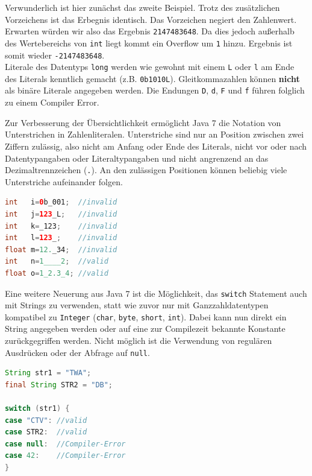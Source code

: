 \documentclass[times, 10pt,twocolumn]{article}
\begin{document}
Verwunderlich ist hier zunächst das zweite Beispiel. Trotz des zusätzlichen Vorzeichens ist das Erbegnis identisch. Das Vorzeichen negiert den Zahlenwert. Erwarten würden wir also das Ergebnis \texttt{2147483648}. Da dies jedoch außerhalb des Wertebereichs von \texttt{int} liegt kommt ein Overflow um \texttt{1} hinzu. Ergebnis ist somit wieder \texttt{-2147483648}.\\

Literale des Datentyps \texttt{long} werden wie gewohnt mit einem \texttt{L} oder \texttt{l} am Ende des Literals kenntlich gemacht (z.B. \texttt{0b1010L}). Gleitkommazahlen können \textbf{nicht} als binäre Literale angegeben werden. Die Endungen \texttt{D}, \texttt{d}, \texttt{F} und \texttt{f} führen folglich zu einem Compiler Error.

Zur Verbesserung der Übersichtlichkeit ermöglicht Java 7 die Notation von Unterstrichen in Zahlenliteralen. Unterstriche sind nur an Position zwischen zwei Ziffern zulässig, also nicht am Anfang oder Ende des Literals, nicht vor oder nach Datentypangaben oder Literaltypangaben und nicht angrenzend an das Dezimaltrennzeichen (\texttt{.}).\cite{apressjava} An den zulässigen Positionen können beliebig viele Unterstriche aufeinander folgen.\cite{heiseWasistNeu}

\begin{lstlisting}[language=java,breaklines=true]
int   i=0b_001;  //invalid
int   j=123_L;   //invalid
int   k=_123;    //invalid
int   l=123_;    //invalid
float m=12._34;  //invalid
int   n=1____2;  //valid
float o=1_2.3_4; //valid
\end{lstlisting}

Eine weitere Neuerung aus Java 7 ist die Möglichkeit, das \texttt{switch} Statement auch mit Strings zu verwenden, statt wie
zuvor nur mit Ganzzahldatentypen kompatibel zu \texttt{Integer} (\texttt{char}, \texttt{byte}, \texttt{short}, \texttt{int}). Dabei kann nun direkt ein String
angegeben werden oder auf eine zur Compilezeit bekannte Konstante zurückgegriffen werden. Nicht möglich ist die Verwendung
von regulären Ausdrücken oder der Abfrage auf \texttt{null}.\cite{javainsel2}

\begin{lstlisting}[language=java,breaklines=true]
String str1 = "TWA";
final String STR2 = "DB";

switch (str1) {
case "CTV": //valid
case STR2:  //valid
case null:  //Compiler-Error
case 42:	//Compiler-Error
}
\end{lstlisting}
\end{document}
